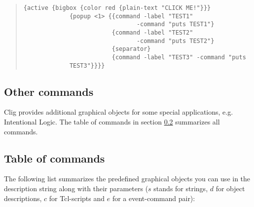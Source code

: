 \begin{quote}
\begin{verbatim}
{active {bigbox {color red {plain-text "CLICK ME!"}}}
             {popup <1> {{command -label "TEST1" 
                                -command "puts TEST1"}
                         {command -label "TEST2" 
                                -command "puts TEST2"}
                         {separator}
                         {command -label "TEST3" -command "puts
             TEST3"}}}}
\end{verbatim}
\end{quote}


\subsection{Other commands}

{\sc Clig} provides additional graphical objects for some special
applications, e.g. Intentional Logic. The table of commands in section
\ref{table} summarizes all commands.  

\subsection{Table of commands}
\label{table}

The following list summarizes the predefined graphical objects you can use
in the description string along with their parameters ($s$ stands for
strings, $d$ for object descriptions, $c$ for Tcl-scripts and $e$ for a
event-command pair):


